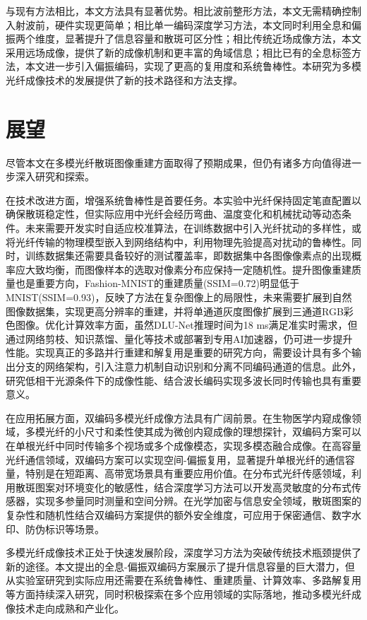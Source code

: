 {与现有方法相比，本文方法具有显著优势。相比波前整形方法，本文无需精确控制入射波前，硬件实现更简单；相比单一编码深度学习方法，本文同时利用全息和偏振两个维度，显著提升了信息容量和散斑可区分性；相比传统近场成像方法，本文采用远场成像，提供了新的成像机制和更丰富的角域信息；相比已有的全息标签方法\cite{collard2024exploiting}，本文进一步引入偏振编码，实现了更高的复用度和系统鲁棒性。本研究为多模光纤成像技术的发展提供了新的技术路径和方法支撑。


\section{展望}

尽管本文在多模光纤散斑图像重建方面取得了预期成果，但仍有诸多方向值得进一步深入研究和探索。

在技术改进方面，增强系统鲁棒性是首要任务。本实验中光纤保持固定笔直配置以确保散斑稳定性，但实际应用中光纤会经历弯曲、温度变化和机械扰动等动态条件。未来需要开发实时自适应校准算法，在训练数据中引入光纤扰动的多样性，或将光纤传输的物理模型嵌入到网络结构中，利用物理先验提高对扰动的鲁棒性。同时，训练数据集还需要具备较好的测试覆盖率，即数据集中各图像像素点的出现概率应大致均衡，而图像样本的选取对像素分布应保持一定随机性。提升图像重建质量也是重要方向，Fashion-MNIST的重建质量(SSIM=0.72)明显低于MNIST(SSIM=0.93)，反映了方法在复杂图像上的局限性，未来需要扩展到自然图像数据集，实现更高分辨率的重建，并将单通道灰度图像扩展到三通道RGB彩色图像。优化计算效率方面，虽然DLU-Net推理时间为18 ms满足准实时需求，但通过网络剪枝、知识蒸馏、量化等技术或部署到专用AI加速器，仍可进一步提升性能。实现真正的多路并行重建和解复用是重要的研究方向，需要设计具有多个输出分支的网络架构，引入注意力机制自动识别和分离不同编码通道的信息。此外，研究低相干光源条件下的成像性能、结合波长编码实现多波长同时传输也具有重要意义。

在应用拓展方面，双编码多模光纤成像方法具有广阔前景。在生物医学内窥成像领域，多模光纤的小尺寸和柔性使其成为微创内窥成像的理想探针，双编码方案可以在单根光纤中同时传输多个视场或多个成像模态，实现多模态融合成像。在高容量光纤通信领域，双编码方案可以实现空间-偏振复用，显著提升单根光纤的通信容量，特别是在短距离、高带宽场景具有重要应用价值。在分布式光纤传感领域，利用散斑图案对环境变化的敏感性，结合深度学习方法可以开发高灵敏度的分布式传感器，实现多参量同时测量和空间分辨。在光学加密与信息安全领域，散斑图案的复杂性和随机性结合双编码方案提供的额外安全维度，可应用于保密通信、数字水印、防伪标识等场景。

多模光纤成像技术正处于快速发展阶段，深度学习方法为突破传统技术瓶颈提供了新的途径。本文提出的全息-偏振双编码方案展示了提升信息容量的巨大潜力，但从实验室研究到实际应用还需要在系统鲁棒性、重建质量、计算效率、多路解复用等方面持续深入研究，同时积极探索在多个应用领域的实际落地，推动多模光纤成像技术走向成熟和产业化。

}

